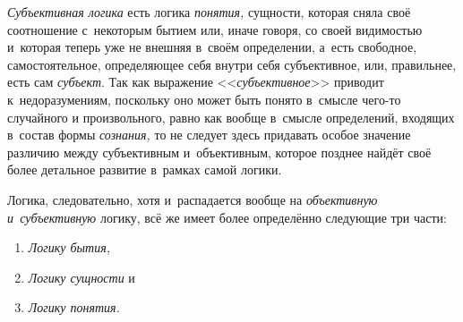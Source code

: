 {\em Субъективная логика} есть логика
{\em понятия,} сущности, которая сняла своё соотношение
с~некоторым бытием или, иначе говоря, со своей видимостью и~которая теперь
уже не внешняя в~своём определении, а~есть свободное, самостоятельное,
определяющее себя внутри себя субъективное, или, правильнее, есть сам
{\em субъект}. Так как выражение
<<{\em субъективное}>> приводит к~недоразумениям,
поскольку оно может быть понято в~смысле чего-то случайного и
произвольного, равно как вообще в~смысле определений, входящих в~состав
формы {\em сознания,} то не следует здесь придавать
особое значение различию между субъективным и~объективным, которое позднее
найдёт своё более детальное развитие в~рамках самой логики.

Логика, следовательно, хотя и~распадается вообще на
{\em объективную и~субъективную} логику, всё же имеет
более определённо следующие три части:
\begin{enumerate}[~~~~I.]
\item{\em Логику бытия,}
\item{\em Логику сущности} и
\item{\em Логику понятия.}
\end{enumerate}

\bigskip
